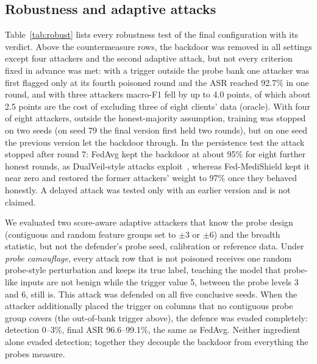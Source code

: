 \documentclass[conference]{IEEEtran}
\begin{document}
\subsection{Robustness and adaptive attacks}
Table~\ref{tab:robust} lists every robustness test of the final configuration with its verdict. Above the countermeasure rows, the backdoor was removed in all settings except four attackers and the second adaptive attack, but not every criterion fixed in advance was met: with a trigger outside the probe bank one attacker was first flagged only at its fourth poisoned round and the ASR reached 92.7\% in one round, and with three attackers macro-F1 fell by up to 4.0 points, of which about 2.5 points are the cost of excluding three of eight clients' data (oracle). With four of eight attackers, outside the honest-majority assumption, training was stopped on two seeds (on seed 79 the final version first held two rounds), but on one seed the previous version let the backdoor through. In the persistence test the attack stopped after round 7: FedAvg kept the backdoor at about 95\% for eight further honest rounds, as DualVeil-style attacks exploit~\cite{zhang2026dualveil}, whereas Fed-MediShield kept it near zero and restored the former attackers' weight to 97\% once they behaved honestly. A delayed attack was tested only with an earlier version and is not claimed.

We evaluated two score-aware adaptive attackers that know the probe design (contiguous and random feature groups set to $\pm3$ or $\pm6$) and the breadth statistic, but not the defender's probe seed, calibration or reference data. Under \emph{probe camouflage}, every attack row that is not poisoned receives one random probe-style perturbation and keeps its true label, teaching the model that probe-like inputs are not benign while the trigger value 5, between the probe levels 3 and 6, still is. This attack was defended on all five conclusive seeds. When the attacker additionally placed the trigger on columns that no contiguous probe group covers (the out-of-bank trigger above), the defence was evaded completely: detection 0--3\%, final ASR 96.6--99.1\%, the same as FedAvg. Neither ingredient alone evaded detection; together they decouple the backdoor from everything the probes measure.
\end{document}
